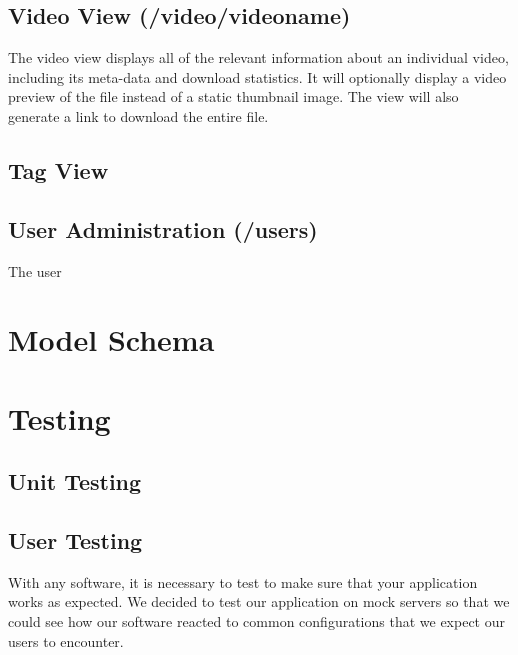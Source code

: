 \documentclass[a4paper,12pt]{report}
\begin{document}
\subsection{Video View (/video/videoname) }
The video view displays all of the relevant information about an individual video, including its meta-data and download statistics.
It will optionally display a video preview of the file instead of a static thumbnail image. The view will also generate a link to download the entire file.

\subsection{Tag View}

\subsection{User Administration (/users) }
The user

\section{Model Schema}

\section{Testing}

\subsection{Unit Testing}

\subsection{User Testing}
With any software, it is necessary to test to make sure that your application works as expected.
We decided to test our application on mock servers so that we could see how our software reacted to common configurations that we expect our users to encounter.
\end{document}

